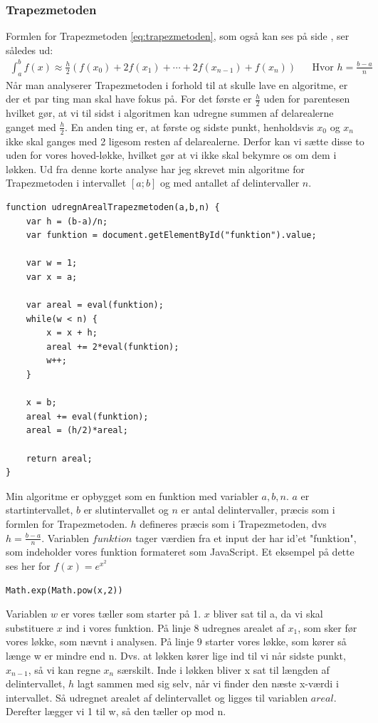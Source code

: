 \documentclass[12pt]{article}
\numberwithin{equation}{section}
\begin{document}
\subsubsection{Trapezmetoden}
Formlen for Trapezmetoden \eqref{eq:trapezmetoden}, som også kan ses på side \pageref{eq:trapezmetoden}, ser således ud:
\begin{align}
\int_{a}^{b}f(x) \approx \frac{h}{2}(f(x_0) + 2f(x_1) + \cdots + 2f(x_{n-1}) + f(x_n)) &&\text{Hvor } h=\frac{b-a}{n} \nonumber
\end{align}
Når man analyserer Trapezmetoden i forhold til at skulle lave en algoritme, er der et par ting man skal have fokus på. For det første er $\frac{h}{2}$ uden for parentesen hvilket gør, at vi til sidst i algoritmen kan udregne summen af delarealerne ganget med $\frac{h}{2}$. En anden ting er, at første og sidste punkt, henholdsvis $x_0$ og $x_n$ ikke skal ganges med 2 ligesom resten af delarealerne. Derfor kan vi sætte disse to uden for vores hoved-løkke, hvilket gør at vi ikke skal bekymre os om dem i løkken.
Ud fra denne korte analyse har jeg skrevet min algoritme for Trapezmetoden i intervallet $[a;b]$ og med antallet af delintervaller $n$.
\begin{lstlisting}[caption="udregnArealTrapezmetoden()"]
function udregnArealTrapezmetoden(a,b,n) {
	var h = (b-a)/n;
	var funktion = document.getElementById("funktion").value;
	
	var w = 1;
	var x = a;
	
	var areal = eval(funktion);
	while(w < n) {
		x = x + h;
		areal += 2*eval(funktion);
		w++;
	}
		
	x = b;
	areal += eval(funktion);
	areal = (h/2)*areal;
		
	return areal;
}
\end{lstlisting}

Min algoritme er opbygget som en funktion med variabler $a,b,n$. $a$ er startintervallet, $b$ er slutintervallet og $n$ er antal delintervaller, præcis som i formlen for Trapezmetoden. $h$ defineres præcis som i Trapezmetoden, dvs $h=\frac{b-a}{n}$. Variablen $funktion$ tager værdien fra et input der har id'et "funktion", som indeholder vores funktion formateret som JavaScript. Et eksempel på dette ses her for $f(x) = e^{x^2}$
\begin{lstlisting}
Math.exp(Math.pow(x,2))
\end{lstlisting}
Variablen $w$ er vores tæller som starter på 1. $x$ bliver sat til a, da vi skal substituere $x$ ind i vores funktion. På linje 8 udregnes arealet af $x_1$, som sker før vores løkke, som nævnt i analysen. På linje 9 starter vores løkke, som kører så længe w er mindre end n. Dvs. at løkken kører lige ind til vi når sidste punkt, $x_{n-1}$, så vi kan regne $x_n$ særskilt. Inde i løkken bliver x sat til længden af delintervallet, $h$ lagt sammen med sig selv, når vi finder den næste x-værdi i intervallet. Så udregnet arealet af delintervallet og ligges til variablen $areal$. Derefter lægger vi 1 til w, så den tæller op mod n.
\end{document}
